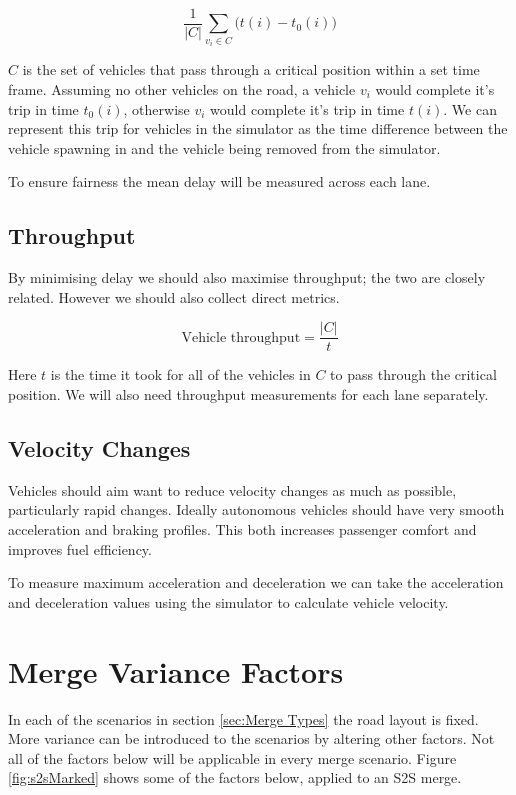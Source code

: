 \begin{equation}
\frac{1}{|C|}\sum_{v_i\in{C}}\bigl(t(i) - t_0(i)\bigr)
\end{equation}

$C$ is the set of vehicles that pass through a critical position within a set time frame. Assuming no other vehicles on the road, a vehicle $v_i$ would complete it's trip in time $t_0(i)$, otherwise $v_i$ would complete it's trip in time $t(i)$. We can represent this trip for vehicles in the simulator as the time difference between the vehicle spawning in and the vehicle being removed from the simulator.

To ensure fairness the mean delay will be measured across each lane.

\subsection{Throughput}
\label{subsec:Throughput}
By minimising delay we should also maximise throughput; the two are closely related. However we should also collect direct metrics.

\begin{equation}
\text{Vehicle throughput} = \frac{|C|}{t}
\end{equation}

Here $t$ is the time it took for all of the vehicles in $C$ to pass through the critical position. We will also need throughput measurements for each lane separately.

\subsection{Velocity Changes}
\label{subsec:Velocity Changes}
Vehicles should aim want to reduce velocity changes as much as possible, particularly rapid changes. Ideally autonomous vehicles should have very smooth acceleration and braking profiles. This both increases passenger comfort and improves fuel efficiency.

To measure maximum acceleration and deceleration we can take the acceleration and deceleration values using the simulator to calculate vehicle velocity.

\section{Merge Variance Factors}
\label{sec:Merge Variance Factors}
In each of the scenarios in section \ref{sec:Merge Types} the road layout is fixed. More variance can be introduced to the scenarios by altering other factors. Not all of the factors below will be applicable in every merge scenario. Figure \ref{fig:s2sMarked} shows some of the factors below, applied to an S2S merge.

